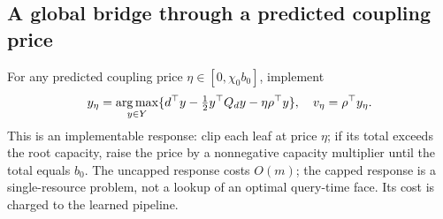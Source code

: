 \subsection{A global bridge through a predicted coupling price}
For any predicted coupling price $\eta\in[0,\chi_0b_0]$, implement
\begin{equation}\label{eq:r14-response}
 y_\eta=\operatorname*{arg\,max}_{y\in Y}\{d^\top y-\tfrac12 y^\top Q_dy-\eta\rho^\top y\},
 \quad v_\eta=\rho^\top y_\eta.
\end{equation}
This is an implementable response: clip each leaf at price $\eta$; if its total exceeds the root capacity, raise the price by a nonnegative capacity multiplier until the total equals $b_0$. The uncapped response costs $O(m)$; the capped response is a single-resource problem, not a lookup of an optimal query-time face. Its cost is charged to the learned pipeline.

